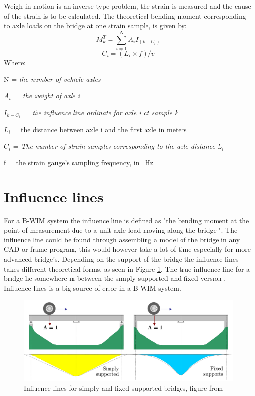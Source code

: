 Weigh in motion is an inverse type problem, the strain is measured and the cause of the strain is to be calculated. The theoretical bending moment corresponding to axle loads on the bridge at one strain sample, is given by:
\begin{equation}
M_k^T = \sum_{i = 1}^{N} A_i I_{(k-C_i)}
\label{equation:theoretical_strain}
\end{equation}
\begin{equation}
C_i = (L_i \times f)/v
\end{equation}
Where:
\begin{description}
	\item N = \textit{the number of vehicle axles}
	\item $A_i = $ \textit{the weight of axle i}
	\item $I_{k-C_i} = $ \textit{the influence line ordinate for axle i at sample k}
	\item $L_i$ = the distance between axle i and the first axle in meters
	\item $C_i$  = \textit{The number of strain samples corresponding to the axle distance $L_i$}
	\item f = the strain gauge's sampling frequency, in \SI{}{\Hz}
\end{description}

\section{Influence lines}
For a B-WIM system the influence line is defined as "the bending moment at the point of measurement due to a unit axle load moving along the bridge \cite{bwim_an_overview}". The influence line could be found through assembling a model of the bridge in any CAD or frame-program, this would however take a lot of time especially for more advanced bridge's. Depending on the support of the bridge the influence lines takes different theoretical forms, as seen in Figure \ref{fig:theoreticalInfl}. The true influence line for a bridge lie somewhere in between the simply supported and fixed version \cite[p.~146]{bwim_an_overview}.
Influence lines is a big source of error in a B-WIM system.
\begin{figure}[h]
\centering
\includegraphics[scale=0.5]{figures/inflLinesQuilligan}
\caption{Influence lines for simply and fixed supported bridges, figure from \cite{Quilligan}}
\label{fig:theoreticalInfl}
\end{figure}

